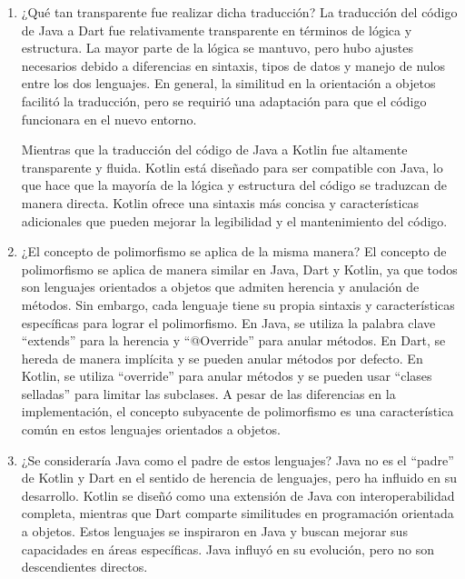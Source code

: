 \documentclass[11pt, twocolumn]{article}
\begin{document}
  \begin{enumerate}[label=\alph*.]
    \item ¿Qué tan transparente fue realizar dicha traducción? 
    La traducción del código de Java a Dart fue relativamente transparente en términos de lógica y estructura. La mayor parte de la lógica se mantuvo, pero hubo ajustes necesarios debido a diferencias en sintaxis, tipos de datos y manejo de nulos entre los dos lenguajes. En general, la similitud en la orientación a objetos facilitó la traducción, pero se requirió una adaptación para que el código funcionara en el nuevo entorno.

    Mientras que la traducción del código de Java a Kotlin fue altamente transparente y fluida. Kotlin está diseñado para ser compatible con Java, lo que hace que la mayoría de la lógica y estructura del código se traduzcan de manera directa. Kotlin ofrece una sintaxis más concisa y características adicionales que pueden mejorar la legibilidad y el mantenimiento del código.

    \item ¿El concepto de polimorfismo se aplica de la misma manera?
    El concepto de polimorfismo se aplica de manera similar en Java, Dart y Kotlin, ya que todos son lenguajes orientados a objetos que admiten herencia y anulación de métodos. Sin embargo, cada lenguaje tiene su propia sintaxis y características específicas para lograr el polimorfismo. En Java, se utiliza la palabra clave ``extends'' para la herencia y ``@Override'' para anular métodos. En Dart, se hereda de manera implícita y se pueden anular métodos por defecto. En Kotlin, se utiliza ``override'' para anular métodos y se pueden usar ``clases selladas'' para limitar las subclases. A pesar de las diferencias en la implementación, el concepto subyacente de polimorfismo es una característica común en estos lenguajes orientados a objetos.

    \item ¿Se consideraría Java como el padre de estos lenguajes?
    Java no es el ``padre'' de Kotlin y Dart en el sentido de herencia de lenguajes, pero ha influido en su desarrollo. Kotlin se diseñó como una extensión de Java con interoperabilidad completa, mientras que Dart comparte similitudes en programación orientada a objetos. Estos lenguajes se inspiraron en Java y buscan mejorar sus capacidades en áreas específicas. Java influyó en su evolución, pero no son descendientes directos.
  \end{enumerate}
\end{document}
